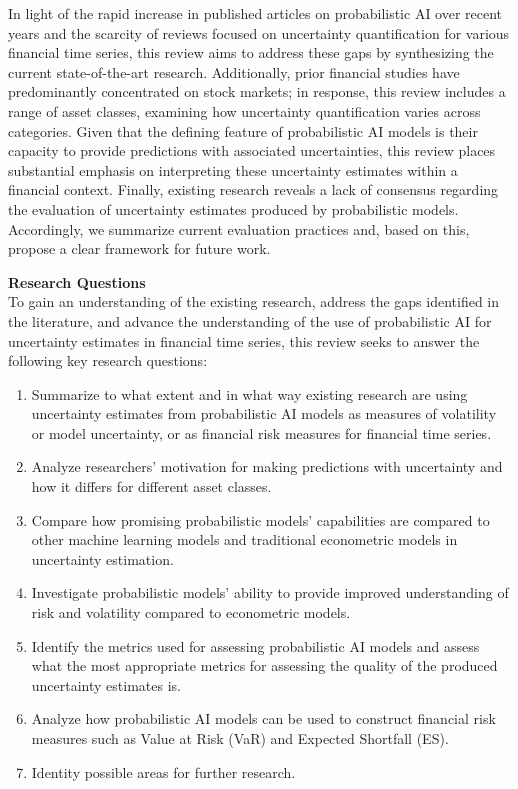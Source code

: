 In light of the rapid increase in published articles on probabilistic AI over recent years and the scarcity of reviews focused on uncertainty quantification for various financial time series, this review aims to address these gaps by synthesizing the current state-of-the-art research. Additionally, prior financial studies have predominantly concentrated on stock markets; in response, this review includes a range of asset classes, examining how uncertainty quantification varies across categories. Given that the defining feature of probabilistic AI models is their capacity to provide predictions with associated uncertainties, this review places substantial emphasis on interpreting these uncertainty estimates within a financial context. Finally, existing research reveals a lack of consensus regarding the evaluation of uncertainty estimates produced by probabilistic models. Accordingly, we summarize current evaluation practices and, based on this, propose a clear framework for future work. 





\textbf{Research Questions}\\
To gain an understanding of the existing research, address the gaps identified in the literature, and advance the understanding of the use of probabilistic AI for uncertainty estimates in financial time series, this review seeks to answer the following key research questions: 
\begin{enumerate}
    \item Summarize to what extent and in what way existing research are using uncertainty estimates from probabilistic AI models as measures of volatility or model uncertainty, or as financial risk measures for financial time series.
    \item Analyze researchers' motivation for making predictions with uncertainty and how it differs for different asset classes.
    \item Compare how promising probabilistic models' capabilities are compared to other machine learning models and traditional econometric models in uncertainty estimation.
    \item Investigate probabilistic models' ability to provide improved understanding of risk and volatility compared to econometric models.
    \item Identify the metrics used for assessing probabilistic AI models and assess what the most appropriate metrics for assessing the quality of the produced uncertainty estimates is.
    \item Analyze how probabilistic AI models can be used to construct financial risk measures such as Value at Risk (VaR) and Expected Shortfall (ES).
    \item Identity possible areas for further research.
\end{enumerate}

